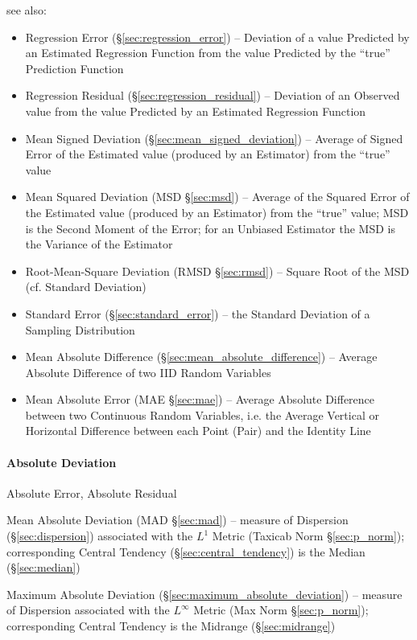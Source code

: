 see also:
\begin{itemize}
  \item Regression Error (\S\ref{sec:regression_error}) -- Deviation of a value
    Predicted by an Estimated Regression Function from the value Predicted by
    the ``true'' Prediction Function
  \item Regression Residual (\S\ref{sec:regression_residual}) -- Deviation of an
    Observed value from the value Predicted by an Estimated Regression Function
  \item Mean Signed Deviation (\S\ref{sec:mean_signed_deviation}) -- Average
    of Signed Error of the Estimated value (produced by an Estimator) from the
    ``true''  value
  \item Mean Squared Deviation (MSD \S\ref{sec:msd}) -- Average of the Squared
    Error of the Estimated value (produced by an Estimator) from the ``true''
    value; MSD is the Second Moment of the Error; for an Unbiased Estimator the
    MSD is the Variance of the Estimator
  \item Root-Mean-Square Deviation (RMSD \S\ref{sec:rmsd}) -- Square Root of the
    MSD (cf. Standard Deviation)
  \item Standard Error (\S\ref{sec:standard_error}) -- the Standard Deviation of
    a Sampling Distribution
  \item Mean Absolute Difference (\S\ref{sec:mean_absolute_difference}) --
    Average Absolute Difference of two IID Random Variables
  \item Mean Absolute Error (MAE \S\ref{sec:mae}) -- Average Absolute Difference
    between two Continuous Random Variables, i.e. the Average Vertical or
    Horizontal Difference between each Point (Pair) and the Identity Line
\end{itemize}



\paragraph{Absolute Deviation}\label{sec:absolute_deviation}\hfill

Absolute Error, Absolute Residual

\fist Mean Absolute Deviation (MAD \S\ref{sec:mad}) -- measure of Dispersion
(\S\ref{sec:dispersion}) associated with the $L^1$ Metric (Taxicab Norm
\S\ref{sec:p_norm}); corresponding Central Tendency
(\S\ref{sec:central_tendency}) is the Median (\S\ref{sec:median})

\fist Maximum Absolute Deviation (\S\ref{sec:maximum_absolute_deviation}) --
measure of Dispersion associated with the $L^{\infty}$ Metric (Max Norm
\S\ref{sec:p_norm}); corresponding Central Tendency is the Midrange
(\S\ref{sec:midrange})




